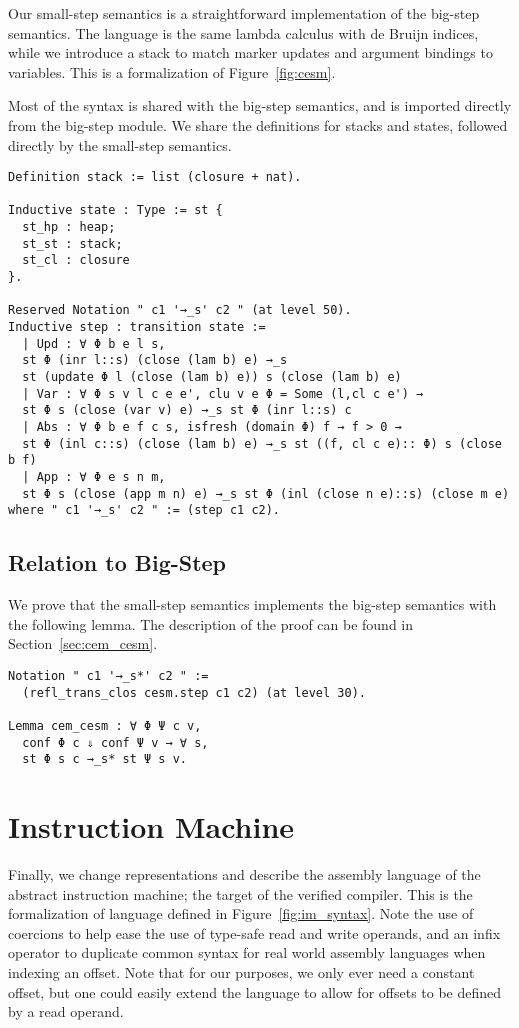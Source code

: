 Our small-step semantics is a straightforward implementation of the big-step
semantics. The language is the same lambda calculus with de Bruijn indices, while
we introduce a stack to match marker updates and argument bindings to variables.
This is a formalization of Figure~\ref{fig:cesm}. 

Most of the syntax is shared with the big-step semantics, and is imported
directly from the big-step module. We share the definitions for stacks and
states, followed directly by the small-step semantics.
\begin{verbatim}
Definition stack := list (closure + nat).

Inductive state : Type := st {
  st_hp : heap; 
  st_st : stack;
  st_cl : closure
}.

Reserved Notation " c1 '→_s' c2 " (at level 50).
Inductive step : transition state :=
  | Upd : ∀ Φ b e l s, 
  st Φ (inr l::s) (close (lam b) e) →_s 
  st (update Φ l (close (lam b) e)) s (close (lam b) e)
  | Var : ∀ Φ s v l c e e', clu v e Φ = Some (l,cl c e') → 
  st Φ s (close (var v) e) →_s st Φ (inr l::s) c
  | Abs : ∀ Φ b e f c s, isfresh (domain Φ) f → f > 0 → 
  st Φ (inl c::s) (close (lam b) e) →_s st ((f, cl c e):: Φ) s (close b f)
  | App : ∀ Φ e s n m, 
  st Φ s (close (app m n) e) →_s st Φ (inl (close n e)::s) (close m e)
where " c1 '→_s' c2 " := (step c1 c2).
\end{verbatim}

\subsection{Relation to Big-Step}

We prove that the small-step semantics implements the big-step semantics with
the following lemma. The description of the proof can be found in
Section~\ref{sec:cem_cesm}. 

\begin{verbatim}
Notation " c1 '→_s*' c2 " := 
  (refl_trans_clos cesm.step c1 c2) (at level 30). 

Lemma cem_cesm : ∀ Φ Ψ c v, 
  conf Φ c ⇓ conf Ψ v → ∀ s, 
  st Φ s c →_s* st Ψ s v. 
\end{verbatim}

\section{Instruction Machine} 

Finally, we change representations and describe the assembly language of the
abstract instruction machine; the target of the verified compiler. This is the
formalization of language defined in Figure~\ref{fig:im_syntax}. Note the use of
coercions to help ease the use of type-safe read and write operands, and an
infix operator to duplicate common syntax for real world assembly languages when
indexing an offset. Note that for our purposes, we only ever need a constant
offset, but one could easily extend the language to allow for offsets to be
defined by a read operand.  

